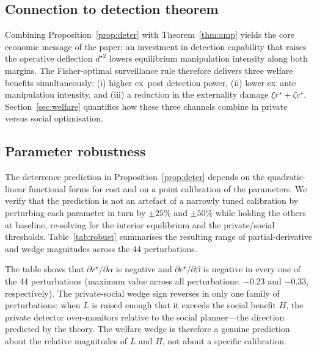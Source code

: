 \documentclass[11pt,a4paper]{article}
\theoremstyle{definition}
\theoremstyle{remark}
\newcommand{\1}{\mathbf{1}}
\begin{document}
\subsection{Connection to detection theorem}
Combining Proposition~\ref{prop:deter} with Theorem~\ref{thm:amp} yields the core economic message of the paper: an investment in detection capability that raises the operative deflection $d^{\star 2}$ lowers equilibrium manipulation intensity along both margins. The Fisher-optimal surveillance rule therefore delivers three welfare benefits simultaneously: (i) higher ex~post detection power, (ii) lower ex~ante manipulation intensity, and (iii) a reduction in the externality damage $\xi r^\star+\zeta c^\star$. Section~\ref{sec:welfare} quantifies how these three channels combine in private versus social optimisation.

\subsection{Parameter robustness}
\label{sec:eq-robust}
The deterrence prediction in Proposition~\ref{prop:deter} depends on the quadratic-linear functional forms for cost and on a point calibration of the parameters. We verify that the prediction is not an artefact of a narrowly tuned calibration by perturbing each parameter in turn by $\pm 25\%$ and $\pm 50\%$ while holding the others at baseline, re-solving for the interior equilibrium and the private/social thresholds. Table~\ref{tab:robust} summarises the resulting range of partial-derivative and wedge magnitudes across the $44$ perturbations.

\begin{table}[htbp]
\centering
\caption{Parameter robustness for the strategic equilibrium. Each row perturbs a single parameter by $\pm 25\%$ and $\pm 50\%$ while holding the others at their baseline values; columns report the minimum and maximum of $\partial r^\star/\partial \alpha$, $\partial c^\star/\partial \beta$, and the private--social wedge $\tau^{\rm priv}-\tau^{\rm soc}$ across the four perturbations. The deterrence sign is preserved in every one of the $44$ perturbations. The wedge sign flips only when the private penalty $L$ is perturbed enough for the ordering of $L$ against the social benefit $H$ to reverse, exactly as predicted by Proposition~\ref{prop:welfare}.}
\label{tab:robust}

\end{table}

The table shows that $\partial r^\star/\partial\alpha$ is negative and $\partial c^\star/\partial\beta$ is negative in every one of the $44$ perturbations (maximum value across all perturbations: $-0.23$ and $-0.33$, respectively). The private-social wedge sign reverses in only one family of perturbations: when $L$ is raised enough that it exceeds the social benefit $H$, the private detector over-monitors relative to the social planner---the direction predicted by the theory. The welfare wedge is therefore a genuine prediction about the relative magnitudes of $L$ and $H$, not about a specific calibration.
\end{document}
